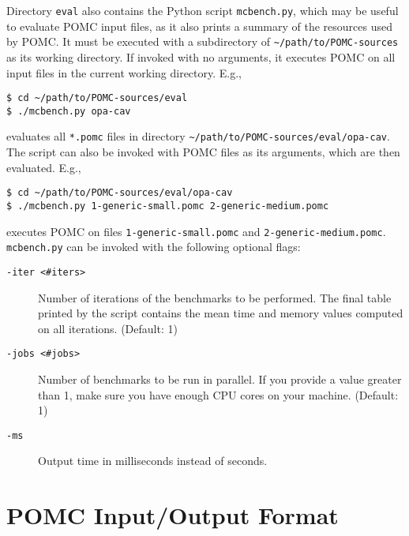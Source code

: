 \documentclass[9pt,a4paper]{article}
\begin{document}
Directory \verb|eval| also contains the Python script \verb|mcbench.py|,
which may be useful to evaluate POMC input files, as it also prints
a summary of the resources used by POMC.
It must be executed with a subdirectory of \verb|~/path/to/POMC-sources|
as its working directory.
If invoked with no arguments, it executes POMC on all input files in the current
working directory. E.g.,
\begin{verbatim}
$ cd ~/path/to/POMC-sources/eval
$ ./mcbench.py opa-cav
\end{verbatim}
evaluates all \verb|*.pomc| files in directory \verb|~/path/to/POMC-sources/eval/opa-cav|.
The script can also be invoked with POMC files as its arguments,
which are then evaluated. E.g.,
\begin{verbatim}
$ cd ~/path/to/POMC-sources/eval/opa-cav
$ ./mcbench.py 1-generic-small.pomc 2-generic-medium.pomc
\end{verbatim}
executes POMC on files \verb|1-generic-small.pomc| and \verb|2-generic-medium.pomc|.
\texttt{mcbench.py} can be invoked with the following optional flags:
\begin{description}
\item[\texttt{-iter <\#iters>}]
  Number of iterations of the benchmarks to be performed.
  The final table printed by the script contains the mean time
  and memory values computed on all iterations. (Default: 1)
\item[\texttt{-jobs <\#jobs>}]
  Number of benchmarks to be run in parallel.
  If you provide a value greater than 1, make sure you have
  enough CPU cores on your machine.
  (Default: 1)
\item[\texttt{-ms}]
  Output time in milliseconds instead of seconds.
\end{description}


\section{POMC Input/Output Format}
\label{sec:format}
\end{document}
